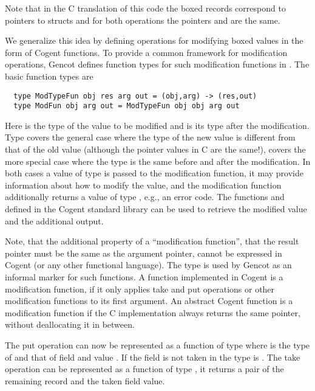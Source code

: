 Note that in the C translation of this code the boxed records correspond to pointers to structs and for both operations
the pointers  and  are the same.

We generalize this idea by defining operations for modifying boxed values in the form of Cogent functions.
To provide a common framework for modification operations, Gencot defines function types for such modification functions 
in . The basic function types are
\begin{verbatim}
  type ModTypeFun obj res arg out = (obj,arg) -> (res,out)
  type ModFun obj arg out = ModTypeFun obj obj arg out
\end{verbatim}
Here  is the type of the value to be modified and  is its type after the modification.
Type  covers the general case where the type of the new value is different from that of the old value (although the pointer
values in C are the same!),  covers the more special case where
the type is the same before and after the modification. In both cases a value of type  is passed to the modification
function, it may provide information about how to modify the value, and the modification function additionally returns a value of
type , e.g., an error code. The functions  and  defined in the Cogent standard library can be used
to retrieve the modified value and the additional output.

Note, that the additional property of a ``modification function'', that the result pointer must be the same as the argument pointer,
cannot be expressed in Cogent (or any other functional language). The type  is used by Gencot as an informal marker
for such functions. A function implemented in Cogent is a modification function, if it only applies take and put operations 
or other modification functions to its
first argument. An abstract Cogent function is a modification function
if the C implementation always returns the same pointer, without deallocating it in between.

The put operation can now be represented as a function of type  where  is the type of
 and  that of field  and value . If the field is not taken in  the type is .
The take operation can be represented as a function of type , it returns 
a pair of the remaining record and the taken field value.

